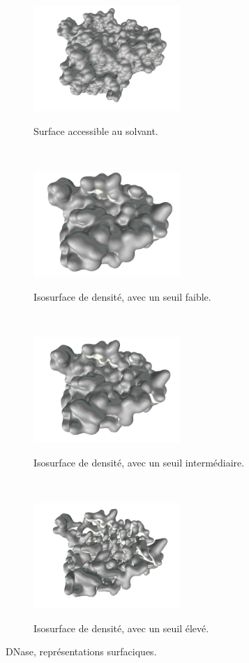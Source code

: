	\newcommand{\subImgW}{0.5\textwidth}
	\begin{figure}[htb]
        \begin{subfigure}[t]{\subImgW}
            \centering
            {\includegraphics[height=4cm]{./figures/ch1/4awn_sas}}
            \caption{Surface accessible au solvant.}
            \label{fig:4awn_sas}
        \end{subfigure}
        ~
        \begin{subfigure}[t]{\subImgW}
            \centering
            {\includegraphics[height=4cm]{./figures/ch1/4awn_iso_0_2}}
            \caption{Isosurface de densité, avec un seuil faible.}
            \label{fig:4awn_iso_0_2}
        \end{subfigure}
        ~
        \begin{subfigure}[t]{\subImgW}
            \centering
            {\includegraphics[height=4cm]{./figures/ch1/4awn_iso_0_5}}
            \caption{}
            \caption{Isosurface de densité, avec un seuil intermédiaire.}
        \end{subfigure}
        ~
        \begin{subfigure}[t]{\subImgW}
            \centering
            {\includegraphics[height=4cm]{./figures/ch1/4awn_iso_1_5}}
            \caption{Isosurface de densité, avec un seuil élevé.}
            \label{fig:4awn_iso_1_5}
        \end{subfigure}
        \caption{DNase, représentations surfaciques.}
        \label{fig:4awn_surf}
    \end{figure}
    
